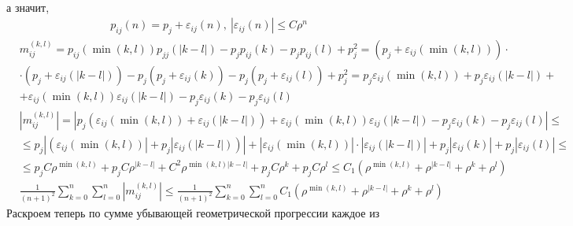 \begin{Proof}
\begin{align*}
    \end{align*}
    а значит,
    \begin{align*}
      & p_{ij}(n) = p_j +\varepsilon_{ij}(n), \ \left| \varepsilon_{ij}(n) \right|\leq C\rho^n
    \end{align*}
    \begin{align*}
      & m_{ij}^{(k,l)} = p_{ij}\left( \min(k,l) \right)p_{jj}\left( \left| k-l \right| \right) - p_j p_{ij}(k) -p_jp_{ij}(l) + p^2_j = \left( p_j +\varepsilon_{ij}\left( \min(k,l) \right)\right)\cdot \\
      & \cdot \left( p_j +\varepsilon_{ij}\left( \left| k-l \right| \right) \right) - p_j \left( p_j +\varepsilon_{ij}(k) \right) -p_j\left( p_j +\varepsilon_{ij}(l) \right) + p^2_j = p_j\varepsilon_{ij}\left( \min(k,l) \right) + p_j\varepsilon_{ij}\left( \left| k-l \right| \right) + \\
      & + \varepsilon_{ij}\left( \min(k,l) \right)\varepsilon_{ij}\left( \left| k-l \right| \right) - p_j \varepsilon_{ij}(k) -p_j \varepsilon_{ij}(l)
    \end{align*}
    \begin{align*}
      & \left| m_{ij}^{(k,l)}\right| = \left| p_j\left( \varepsilon_{ij}\left( \min(k,l) \right) + \varepsilon_{ij}\left( \left| k-l \right| \right)\right) + \varepsilon_{ij}\left( \min(k,l) \right)\varepsilon_{ij}\left( \left| k-l \right| \right) - p_j \varepsilon_{ij}(k) -p_j \varepsilon_{ij}(l)\right| \leq \\
      & \leq p_j \left| \left( \varepsilon_{ij}\left( \min(k,l) \right)\right| + p_j\left| \varepsilon_{ij}\left( \left| k-l \right| \right)\right)\right| + \left| \varepsilon_{ij}\left( \min(k,l) \right)\right|\cdot\left| \varepsilon_{ij}\left( \left| k-l \right| \right)\right| + p_j \left| \varepsilon_{ij}(k)\right| + p_j \left| \varepsilon_{ij}(l)\right| \leq \\
      & \leq p_jC\rho^{\min(k,l)} + p_j C\rho^{\left| k-l \right|} + C^2\rho^{\min(k,l)\left| k-l \right|} + p_j C\rho^k + p_j C \rho^l \leq C_1\left(  \rho^{\min(k,l)} + \rho^{\left| k-l \right|} + \rho^k + \rho^l \right)
    \end{align*}
    \begin{align*}
      & \frac{1}{(n+1)^2}\sum_{k=0}^n \sum_{l=0}^n \left| m_{ij}^{(k,l)}\right| \leq \frac{1}{(n+1)^2} \sum_{k=0}^n\sum_{l=0}^n C_1\left(  \rho^{\min(k,l)} + \rho^{\left| k-l \right|} + \rho^k + \rho^l \right)
    \end{align*}
    Раскроем теперь по сумме убывающей геометрической прогрессии каждое из

\end{Proof}
